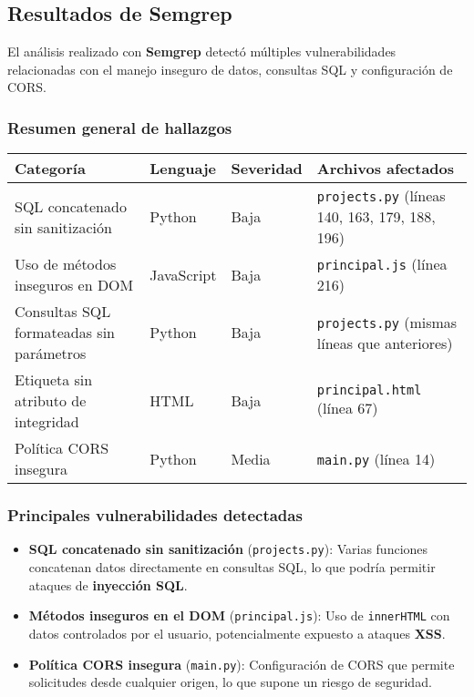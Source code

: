 \documentclass[12pt, a4paper]{article}
\begin{document}
\subsection{Resultados de Semgrep}
El análisis realizado con \textbf{Semgrep} detectó múltiples vulnerabilidades relacionadas con el manejo inseguro de 
datos, consultas SQL y configuración de CORS.

\subsubsection*{Resumen general de hallazgos}
\begin{table}[h!]
\footnotesize
\centering
\begin{tabularx}{\textwidth}{@{} L{3.6cm} L{2.2cm} L{2.2cm} Y @{}}
\toprule
\textbf{Categoría} & \textbf{Lenguaje} & \textbf{Severidad} & \textbf{Archivos afectados} \\
\midrule
SQL concatenado sin sanitización & Python & Baja & \texttt{projects.py} (líneas 140, 163, 179, 188, 196) \\
Uso de métodos inseguros en DOM & JavaScript & Baja & \texttt{principal.js} (línea 216) \\
Consultas SQL formateadas sin parámetros & Python & Baja & \texttt{projects.py} (mismas líneas que anteriores) \\
Etiqueta sin atributo de integridad & HTML & Baja & \texttt{principal.html} (línea 67) \\
Política CORS insegura & Python & Media & \texttt{main.py} (línea 14) \\
\bottomrule
\end{tabularx}
\end{table}

\subsubsection*{Principales vulnerabilidades detectadas}
\begin{itemize}
    \item \textbf{SQL concatenado sin sanitización} (\texttt{projects.py}):  
    Varias funciones concatenan datos directamente en consultas SQL, lo que podría permitir ataques de \textbf{inyección SQL}.
    \item \textbf{Métodos inseguros en el DOM} (\texttt{principal.js}):  
    Uso de \texttt{innerHTML} con datos controlados por el usuario, potencialmente expuesto a ataques \textbf{XSS}.
    \item \textbf{Política CORS insegura} (\texttt{main.py}):  
    Configuración de CORS que permite solicitudes desde cualquier origen, lo que supone un riesgo de seguridad.
\end{itemize}
\end{document}
